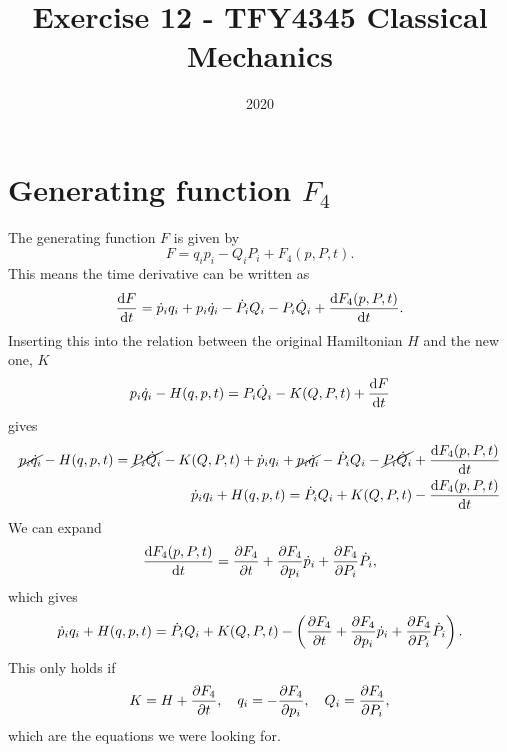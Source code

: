 \documentclass{article}
\title{Exercise 12 - TFY4345 Classical Mechanics}
\date{2020}
\begin{document}
    \maketitle
    \section{Generating function $F_4$}
        The generating function $F$ is given by
        \begin{equation*}
            F = q_ip_i - Q_iP_i + F_4(p, P, t).
        \end{equation*}
        This means the time derivative can be written as
        \begin{equation*}
            \dv{F}{t} = \dot p_i q_i + p_i \dot q_i - \dot P_i Q_i - P_i \dot Q_i + \dv{F_4(p, P, t)}{t}.
        \end{equation*}
        Inserting this into the relation between the original Hamiltonian $H$ and the new one, $K$
        \begin{equation*}
            p_i \dot q_i - H(q, p, t) = P_i \dot Q_i - K(Q, P, t) + \dv{F}{t}
        \end{equation*}
        gives
        \begin{align*}
            \cancel{p_i \dot q_i} - H(q, p, t) = \cancel{P_i \dot Q_i} - K(Q, P, t) + \dot p_i q_i + \cancel{p_i \dot q_i} - \dot P_i Q_i - \cancel{P_i \dot Q_i} + \dv{F_4(p, P, t)}{t} \\
            \dot p_i q_i  + H(q, p, t) =  \dot P_i Q_i + K(Q, P, t) - \dv{F_4(p, P, t)}{t} 
        \end{align*}
        We can expand 
        \begin{equation*}
            \dv{F_4(p, P, t)}{t} = \pdv{F_4}{t} + \pdv{F_4}{p_i} \dot p_i +  \pdv{F_4}{P_i} \dot P_i,
        \end{equation*}
        which gives
        \begin{equation*}
            \dot p_i q_i  + H(q, p, t) =  \dot P_i Q_i + K(Q, P, t) - \left(\pdv{F_4}{t} + \pdv{F_4}{p_i} \dot p_i +  \pdv{F_4}{P_i} \dot P_i\right).
        \end{equation*}
        This only holds if
        \begin{equation*}
            K = H + \pdv{F_4}{t}, \quad q_i = - \pdv{F_4}{p_i}, \quad Q_i = \pdv{F_4}{P_i},
        \end{equation*}
        which are the equations we were looking for.
            
\end{document}
